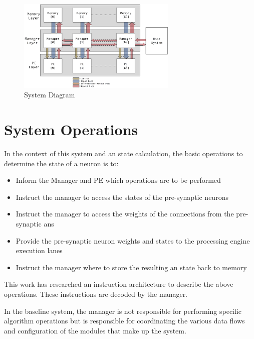 \documentclass[journal]{IEEEtran}
\begin{document}

\begin{figure}[!t]
\centering
\captionsetup{justification=centering}
\centerline{
\mbox{\includegraphics[width=3.0in]{FlowDiagram.jpg}}
}
\caption{System Diagram}
\label{fig:FlowDiagram}
\end{figure}


\section{System Operations}
\label{sec:System Operations}
In the context of this system and \ac{an} state calculation, the basic operations to determine the state of a neuron is to:

\begin{itemize}
    \item Inform the Manager and PE which operations are to be performed
    \item Instruct the manager to access the states of the pre-synaptic neurons
    \item Instruct the manager to access the weights of the connections from the pre-synaptic \acp{an}
    \item Provide the pre-synaptic neuron weights and states to the processing engine execution lanes
    \item Instruct the manager where to store the resulting \ac{an} state back to memory
\end{itemize}

This work has researched an instruction architecture to describe the above operations. 
These instructions are decoded by the manager. 

In the baseline system, the manager is not responsible for performing specific algorithm operations but is responsible for coordinating the various data flows and configuration of the modules that make up the system.
\end{document}
